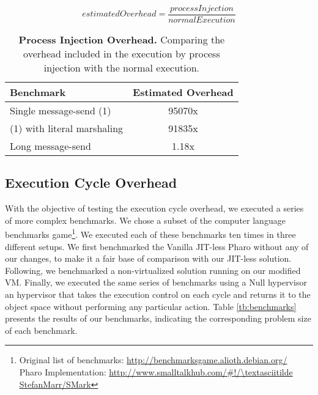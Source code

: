 \begin{equation*}
estimatedOverhead = \frac{processInjection}{normalExecution}
\end{equation*}

\begin{table}[ht]
 	\centering
 	\begin{tabular}{lc}
			\toprule
			\textbf{Benchmark}
 			& \textbf{Estimated Overhead}\\
		\midrule
		Single message-send (1) & 95070x \\\midrule
		(1) with literal marshaling & 91835x \\\midrule
		Long message-send & 1.18x  \\\midrule
 	\end{tabular}
	\vspace*{0.2cm}
 	\caption{\textbf{Process Injection Overhead.} Comparing the overhead included in the execution by process injection with the normal execution.\label{tb:benchmarks_injection_comparison}}
 \end{table}

\subsection{Execution Cycle Overhead}
With the objective of testing the execution cycle overhead, we executed a series of more complex benchmarks. We chose a subset of the computer language benchmarks game\footnote{Original list of benchmarks: \url{http://benchmarksgame.alioth.debian.org/}\\Pharo Implementation: \url{http://www.smalltalkhub.com/\#!/\textasciitilde StefanMarr/SMark}}. We executed each of these benchmarks ten times in three different setups. We first benchmarked the Vanilla JIT-less Pharo \VM without any of our changes, to make it a fair base of comparison with our JIT-less solution. Following, we benchmarked a non-virtualized solution running on our modified VM. Finally, we executed the same series of benchmarks using a Null hypervisor \ie an hypervisor that takes the execution control on each cycle and returns it to the object space without performing any particular action. Table \ref{tb:benchmarks} presents the results of our benchmarks, indicating the corresponding problem size of each benchmark.


